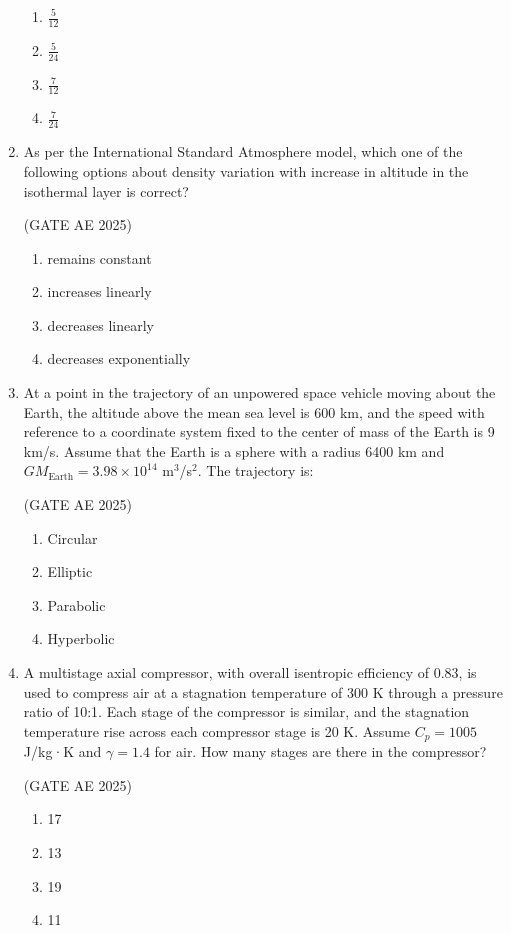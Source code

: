 \documentclass[journal,12pt,onecolumn]{IEEEtran}
\theoremstyle{remark}
\begin{document}
\begin{flushleft}
\begin{enumerate}
\begin{enumerate}
   \item $\frac{5}{12}$
    \item $\frac{5}{24}$
    \item $\frac{7}{12}$
    \item $\frac{7}{24}$
\end{enumerate}
   
\item As per the International Standard Atmosphere model, which one of the following options about density variation with increase in altitude in the isothermal layer is correct?

\hfill (GATE AE 2025)

\begin{enumerate}
 \item remains constant
 \item increases linearly
 \item decreases linearly
 \item decreases exponentially
\end{enumerate}

\item At a point in the trajectory of an unpowered space vehicle moving about the Earth, the altitude above the mean sea level is 600 km, and the speed with reference to a coordinate system fixed to the center of mass of the Earth is 9 km/s. Assume that the Earth is a sphere with a radius 6400 km and $GM_{\text{Earth}} = 3.98 \times 10^{14}$ m$^3$/s$^2$. The trajectory is:

\hfill (GATE AE 2025)

\begin{enumerate}
\item Circular
\item Elliptic
\item Parabolic
\item Hyperbolic
\end{enumerate}
  

\item  A multistage axial compressor, with overall isentropic efficiency of 0.83, is used to compress air at a stagnation temperature of 300 K through a pressure ratio of 10:1. Each stage of the compressor is similar, and the stagnation temperature rise across each compressor stage is 20 K. Assume $C_p = 1005$ J/kg·K and $\gamma = 1.4$ for air. How many stages are there in the compressor?

\hfill (GATE AE 2025)

\begin{enumerate}
    \item 17
    \item 13
    \item 19
    \item 11
\end{enumerate}


\end{enumerate}
\end{flushleft}
\end{document}
